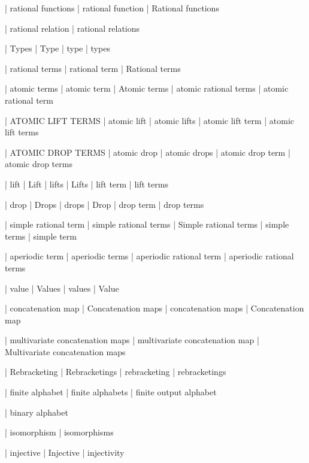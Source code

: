 
 | rational functions
 | rational function
 | Rational functions

 | rational relation
 | rational relations


 | Types
 | Type
 | type
 | types

 | rational terms
 | rational term
 | Rational terms

 | atomic terms
 | atomic term
 | Atomic terms
 | atomic rational terms
 | atomic rational term

 | ATOMIC LIFT TERMS
 | atomic lift
 | atomic lifts
 | atomic lift term
 | atomic lift terms

 | ATOMIC DROP TERMS
 | atomic drop
 | atomic drops
 | atomic drop term
 | atomic drop terms

 | lift
 | Lift
 | lifts
 | Lifts
 | lift term
 | lift terms

 | drop
 | Drops
 | drops
 | Drop
 | drop term
 | drop terms

  | simple rational term
  | simple rational terms
  | Simple rational terms
  | simple terms
  | simple term


  | aperiodic term
  | aperiodic terms
  | aperiodic rational term
  | aperiodic rational terms


 | value
 | Values
 | values
 | Value

 | concatenation map
 | Concatenation maps
 | concatenation maps
 | Concatenation map

 | multivariate concatenation maps
 | multivariate concatenation map
 | Multivariate concatenation maps


 | Rebracketing
 | Rebracketings
 | rebracketing
 | rebracketings


  | finite alphabet
  | finite alphabets
  | finite output alphabet

  | binary alphabet


 | isomorphism
 | isomorphisms

 | injective
 | Injective
 | injectivity

